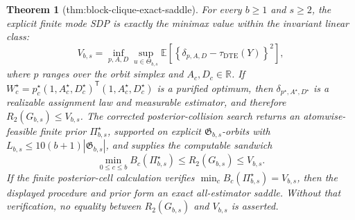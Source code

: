 \documentclass{article}
\newtheorem{theorem}{Theorem}
\begin{document}
\begin{theorem}[thm:block-clique-exact-saddle]\label{thm:block-clique-exact-saddle}
For every \(b\ge1\) and \(s\ge2\), the explicit finite mode SDP is exactly the minimax value within the invariant linear class:
\[
V_{b,s}=
\inf_{p,A,D}\sup_{u\in\Theta_{b,s}}
\mathbb E\!\left[\left\{\delta_{p,A,D}-\tau_{\mathrm{DTE}}(Y)\right\}^2\right],
\]
where \(p\) ranges over the orbit simplex and \(A_c,D_c\in\mathbb R\). If \(W_c^{\star}=p_c^{\star}(1,A_c^{\star},D_c^{\star})^{\mathsf T}(1,A_c^{\star},D_c^{\star})\) is a purified optimum, then \(\delta_{p^{\star},A^{\star},D^{\star}}\) is a realizable assignment law and measurable estimator, and therefore \(R_2(G_{b,s})\le V_{b,s}\). The corrected posterior-collision search returns an atomwise-feasible finite prior \(\Pi_{b,s}^{\star}\), supported on explicit \(\mathfrak G_{b,s}\)-orbits with \(L_{b,s}\le10(b+1)|\mathfrak G_{b,s}|\), and supplies the computable sandwich
\[
\min_{0\le c\le b}B_c(\Pi_{b,s}^{\star})
\le R_2(G_{b,s})\le V_{b,s}.
\]
If the finite posterior-cell calculation verifies \(\min_cB_c(\Pi_{b,s}^{\star})=V_{b,s}\), then the displayed procedure and prior form an exact all-estimator saddle. Without that verification, no equality between \(R_2(G_{b,s})\) and \(V_{b,s}\) is asserted.
\end{theorem}
\end{document}
